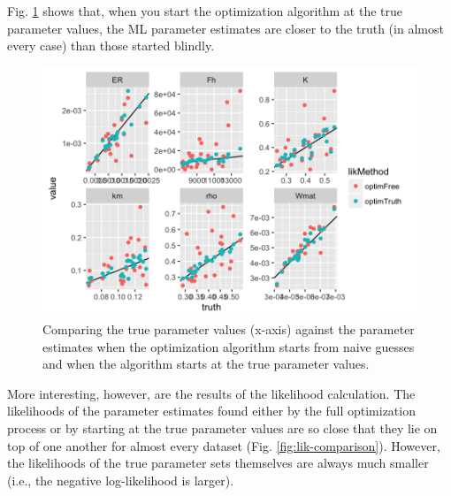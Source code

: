 \documentclass[12pt,reqno,final,pdftex]{amsart}\usepackage[]{graphicx}\usepackage[]{color}
\newenvironment{knitrout}{}{} %
\theoremstyle{plain}
\numberwithin{equation}{part}
\begin{document}
Fig. \ref{fig:free-vs-truth-start} shows that, when you start the optimization algorithm at the true parameter values, the ML parameter estimates are closer to the truth (in almost every case) than those started blindly.

\begin{knitrout}\scriptsize
{}\color{fgcolor}\begin{figure}

\includegraphics[width=\linewidth]{figure/free-vs-truth-start-1} \hfill{}

\caption[Comparing the true parameter values (x-axis) against the parameter estimates when the optimization algorithm starts from naive guesses and when the algorithm starts at the true parameter values]{Comparing the true parameter values (x-axis) against the parameter estimates when the optimization algorithm starts from naive guesses and when the algorithm starts at the true parameter values.}\label{fig:free-vs-truth-start}
\end{figure}


\end{knitrout}

More interesting, however, are the results of the likelihood calculation.
The likelihoods of the parameter estimates found either by the full optimization process or by starting at the true parameter values are so close that they lie on top of one another for almost every dataset (Fig. \ref{fig:lik-comparison}).
However, the likelihoods of the true parameter sets themselves are always much smaller (i.e., the negative log-likelihood is larger).
\end{document}
